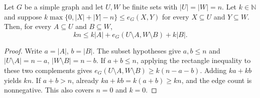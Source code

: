 \begin{lemma}
Let $G$ be a simple graph and let $U,W$ be finite sets with
$|U|=|W|=n$. Let $k\in\mathbb N$ and suppose
$k\max\{0,|X|+|Y|-n\}\leq e_G(X,Y)$ for every $X\subseteq U$ and
$Y\subseteq W$. Then, for every $A\subseteq U$ and $B\subseteq W$,
\[
 kn\leq k|A|+e_G(U\setminus A,W\setminus B)+k|B|.
\]
\end{lemma}
\begin{proof}
Write $a=|A|$, $b=|B|$. The subset hypotheses give $a,b\leq n$ and
$|U\setminus A|=n-a$, $|W\setminus B|=n-b$. If $a+b\leq n$, applying
the rectangle inequality to these two complements gives
$e_G(U\setminus A,W\setminus B)\geq k(n-a-b)$. Adding $ka+kb$ yields
$kn$. If $a+b>n$, already $ka+kb=k(a+b)\geq kn$, and the edge count
is nonnegative. This also covers $n=0$ and $k=0$.
\end{proof}
